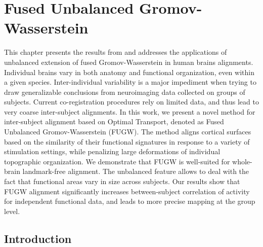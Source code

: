 
\chapter{Fused Unbalanced Gromov-Wasserstein} \label{chap:fugw}

\renewcommand{\contentsname}{Contents}
\localtableofcontents*
{}

\hfill \break
This chapter presents the results from \citep{Thual22} and addresses the applications of
unbalanced extension of fused Gromov-Wasserstein in human brains alignments.
Individual brains vary in both anatomy and functional organization, even within a given species.
Inter-individual variability is a major impediment when trying to draw generalizable conclusions
from neuroimaging data collected on groups of subjects.
Current co-registration procedures rely on limited data, and thus lead to very coarse
inter-subject alignments.
In this work, we present a novel method for inter-subject alignment based on Optimal Transport,
denoted as Fused Unbalanced Gromov-Wasserstein (FUGW).
The method aligns cortical surfaces based on the similarity of their functional signatures in
response to a variety of stimulation settings, while penalizing large deformations of
individual topographic organization.
We demonstrate that FUGW is well-suited for whole-brain landmark-free alignment.
The unbalanced feature allows to deal with the fact that functional areas
vary in size across subjects. Our results show that FUGW alignment significantly
increases between-subject correlation of activity for independent functional data,
and leads to more precise mapping at the group level.

\raggedbottom

\section{Introduction}
\label{sec:introduction}

